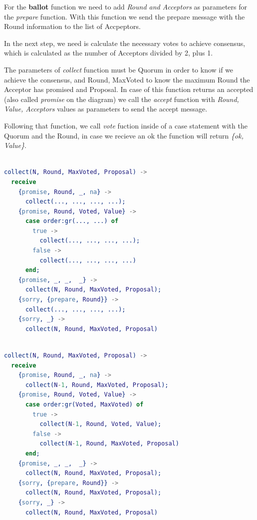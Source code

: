 \documentclass[a4paper, 10pt]{article}
\begin{document}
  For the \textbf{ballot} function we need to add \textit{Round and Acceptors} as parameters for the \textit{prepare} function. With this function we send the prepare message with the Round information to the list of Accpeptors. 

  In the next step, we need is calculate the necessary votes to achieve consensus, which is calculated as the number of Acceptors divided by 2, plus 1.

  The parameters of \textit{collect} function must be Quorum in order to know if we achieve the consensus, and Round, MaxVoted to know the maximum Round the Acceptor has promised and Proposal. In case of this function returns an accepted (also called \textit{promise} on the diagram) we call the \textit{accept} function with \textit{Round, Value, Acceptors} values as parameters to send the accept message. 

  Following that function, we call \textit{vote} fuction inside of a case statement with the Quorum and the Round, in case we recieve an ok the function will return \textit{\{ok, Value\}}.


    \begin{minipage}{.45\textwidth}
	\begin{lstlisting}[language=erlang, caption={Template}]
	
collect(N, Round, MaxVoted, Proposal) ->
  receive 
    {promise, Round, _, na} ->
      collect(..., ..., ..., ...);
    {promise, Round, Voted, Value} ->
      case order:gr(..., ...) of
        true ->
          collect(..., ..., ..., ...);
        false ->
          collect(..., ..., ..., ...)
      end;
    {promise, _, _,  _} ->
      collect(N, Round, MaxVoted, Proposal);
    {sorry, {prepare, Round}} ->
      collect(..., ..., ..., ...);
    {sorry, _} ->
      collect(N, Round, MaxVoted, Proposal)
  \end{lstlisting}
    \end{minipage}\hfill
    \begin{minipage}{.45\textwidth}
	\begin{lstlisting}[language=erlang, caption={Filled version}]
	
collect(N, Round, MaxVoted, Proposal) ->
  receive 
    {promise, Round, _, na} ->
      collect(N-1, Round, MaxVoted, Proposal);
    {promise, Round, Voted, Value} ->
      case order:gr(Voted, MaxVoted) of
        true ->
          collect(N-1, Round, Voted, Value);
        false ->
          collect(N-1, Round, MaxVoted, Proposal)
      end;
    {promise, _, _,  _} ->
      collect(N, Round, MaxVoted, Proposal);
    {sorry, {prepare, Round}} ->
      collect(N, Round, MaxVoted, Proposal);
    {sorry, _} ->
      collect(N, Round, MaxVoted, Proposal)
	\end{lstlisting}
    \end{minipage}
\end{document}
